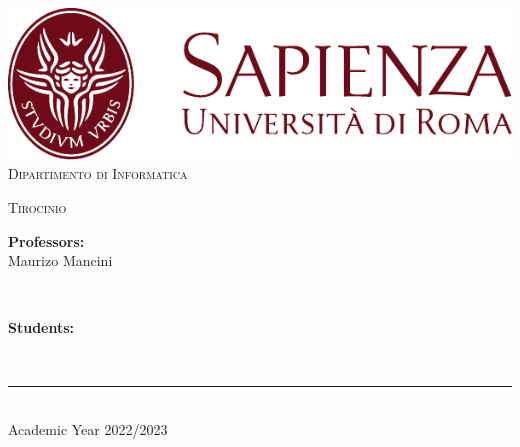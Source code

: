 \begin{titlepage}
	\centering
    \vspace*{0.5 cm}
    \includegraphics[scale = 0.75]{figures/SapienzaLogo.pdf}\\[1.0 cm]	%

    \vspace*{-0.4cm}
    \textsc{\large Dipartimento di Informatica}\\[2.0 cm]	%
    \vspace*{1cm}

    { \fontsize{20.74pt}{18.5pt}\selectfont\bfseries \thetitle \par } %

    \vspace*{0.25cm}
    \textsc{\Large Tirocinio }\\[0.5 cm] %

    \vspace*{2.6cm}
	\begin{minipage}{0.4\textwidth} %
		\begin{flushleft} \large
			\textbf{Professors:}\\
			Maurizo Mancini\\
		\end{flushleft}
	\end{minipage}~
	\begin{minipage}{0.3\textwidth} %
		\begin{flushright} \large
		\begin{minipage}{1\textwidth}
		\begin{flushleft} \large
			\textbf{Students:} \\
			\theauthor
        \end{flushleft}
        \end{minipage}
		\end{flushright}
	\end{minipage}\\[3.85 cm]

    \vspace{2cm}
    \rule{\linewidth}{0.2 mm} \\[0.3 cm]
    \vspace*{-0.2cm}
    Academic Year 2022/2023
\end{titlepage}
